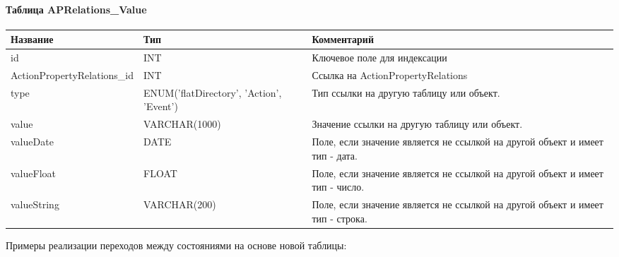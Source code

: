 \documentclass[a4paper,8pt]{report} %
\begin{document}
{    \paragraph*{Таблица APRelations\_Value}
    \begin{tabularx}{\textwidth}{ |X|X|X| }
            \hline
            \textbf{Название} & \textbf{Тип} & \textbf{Комментарий} \\
            \hline
                id & INT & Ключевое поле для индексации \\ \hline
                ActionPropertyRelations\_id & INT & Ссылка на ActionPropertyRelations \\ \hline
                type & ENUM('flatDirectory', 'Action', 'Event') & Тип ссылки на другую таблицу или объект. \\ \hline
                value & VARCHAR(1000) & Значение ссылки на другую таблицу или объект. \\ \hline
                valueDate & DATE & Поле, если значение является не ссылкой на другой объект и имеет тип - дата. \\ \hline
                valueFloat & FLOAT & Поле, если значение является не ссылкой на другой объект и имеет тип - число. \\ \hline
                valueString & VARCHAR(200) & Поле, если значение является не ссылкой на другой объект и имеет тип - строка. \\
            \hline
         \end{tabularx}

    Примеры реализации переходов между состояниями на основе новой таблицы:
 }
 
\end{document}
